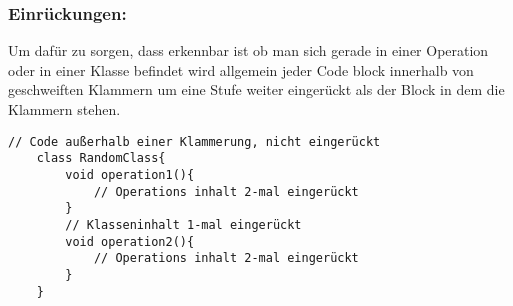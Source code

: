 \subsubsection*{Einrückungen:}
Um dafür zu sorgen, dass erkennbar ist ob man sich gerade in einer Operation oder in einer Klasse befindet wird allgemein jeder Code block innerhalb von geschweiften Klammern um eine Stufe weiter eingerückt als der Block in dem die Klammern stehen.

\begin{lstlisting}[title=\textbf{Beispiel gute Namensgebung}]
	// Code außerhalb einer Klammerung, nicht eingerückt
	class RandomClass{
		void operation1(){
			// Operations inhalt 2-mal eingerückt
		}
		// Klasseninhalt 1-mal eingerückt
		void operation2(){
			// Operations inhalt 2-mal eingerückt
		}
	}
	
\end{lstlisting}
